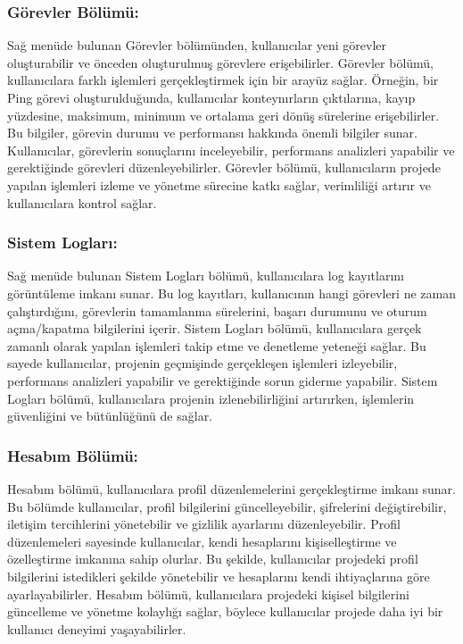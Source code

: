 \subsubsection{Görevler Bölümü:}
Sağ menüde bulunan Görevler bölümünden, kullanıcılar yeni görevler oluşturabilir ve önceden oluşturulmuş görevlere erişebilirler. Görevler bölümü, kullanıcılara farklı işlemleri gerçekleştirmek için bir arayüz sağlar. Örneğin, bir Ping görevi oluşturulduğunda, kullanıcılar konteynırların çıktılarına, kayıp yüzdesine, maksimum, minimum ve ortalama geri dönüş sürelerine erişebilirler. Bu bilgiler, görevin durumu ve performansı hakkında önemli bilgiler sunar. Kullanıcılar, görevlerin sonuçlarını inceleyebilir, performans analizleri yapabilir ve gerektiğinde görevleri düzenleyebilirler. Görevler bölümü, kullanıcıların projede yapılan işlemleri izleme ve yönetme sürecine katkı sağlar, verimliliği artırır ve kullanıcılara kontrol sağlar.
\subsubsection{Sistem Logları:}
Sağ menüde bulunan Sistem Logları bölümü, kullanıcılara log kayıtlarını görüntüleme imkanı sunar. Bu log kayıtları, kullanıcının hangi görevleri ne zaman çalıştırdığını, görevlerin tamamlanma sürelerini, başarı durumunu ve oturum açma/kapatma bilgilerini içerir. Sistem Logları bölümü, kullanıcılara gerçek zamanlı olarak yapılan işlemleri takip etme ve denetleme yeteneği sağlar. Bu sayede kullanıcılar, projenin geçmişinde gerçekleşen işlemleri izleyebilir, performans analizleri yapabilir ve gerektiğinde sorun giderme yapabilir. Sistem Logları bölümü, kullanıcılara projenin izlenebilirliğini artırırken, işlemlerin güvenliğini ve bütünlüğünü de sağlar.
\subsubsection{Hesabım Bölümü:}
Hesabım bölümü, kullanıcılara profil düzenlemelerini gerçekleştirme imkanı sunar. Bu bölümde kullanıcılar, profil bilgilerini güncelleyebilir, şifrelerini değiştirebilir, iletişim tercihlerini yönetebilir ve gizlilik ayarlarını düzenleyebilir. Profil düzenlemeleri sayesinde kullanıcılar, kendi hesaplarını kişiselleştirme ve özelleştirme imkanına sahip olurlar. Bu şekilde, kullanıcılar projedeki profil bilgilerini istedikleri şekilde yönetebilir ve hesaplarını kendi ihtiyaçlarına göre ayarlayabilirler. Hesabım bölümü, kullanıcılara projedeki kişisel bilgilerini güncelleme ve yönetme kolaylığı sağlar, böylece kullanıcılar projede daha iyi bir kullanıcı deneyimi yaşayabilirler.

